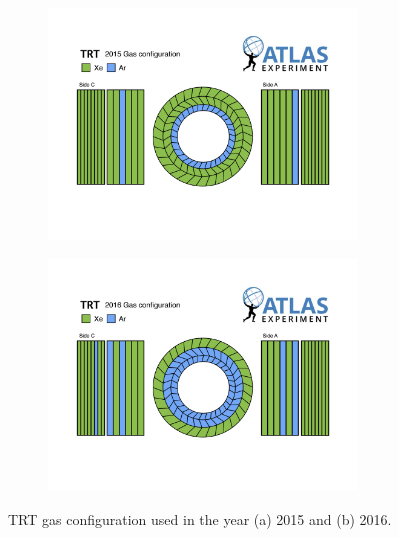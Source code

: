 \begin{figure}[tb!]
  \begin{subfigure}{0.5\textwidth}
  \centering
  \includegraphics[width=0.9\textwidth]{figures/Detector/trtfig_01.png}
  \caption{}
  \label{chp:det:atlas:trt2015}
\end{subfigure}
\begin{subfigure}{0.5\textwidth}
  \centering
  \includegraphics[width=0.9\textwidth]{figures/Detector/trtfig_02.png}
  \caption{}
  \label{chp:det:atlas:trt2016}
\end{subfigure}

\captionsetup{width=0.85\textwidth} \caption{\small TRT gas configuration used in the year (a) 2015 and (b) 2016.}
\label{sec:det:fig:trfgas}
\end{figure}


